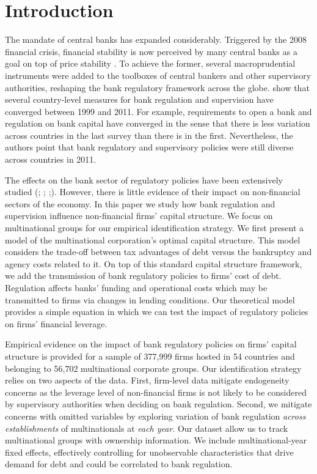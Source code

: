 \documentclass[12pt]{article}
\begin{document}
	\doublespacing
	
	
	\section{Introduction} \label{sec:introduction}
	The mandate of central banks has expanded considerably. Triggered by the 2008 financial crisis, financial stability is now perceived by many central banks as a goal on top of price stability \citep*{blinder2017necessity}. To achieve the former, several macroprudential instruments were added to the toolboxes of central bankers and other supervisory authorities, reshaping the bank regulatory framework across the globe. \cite*{barth2013bank} show that several country-level measures for bank regulation and supervision have converged between 1999 and 2011. For example, requirements to open a bank and regulation on bank capital have converged in the sense that there is less variation across countries in the last survey than there is in the first. Nevertheless, the authors point that bank regulatory and supervisory policies were still diverse across countries in 2011.
	
	The effects on the bank sector of regulatory policies have been extensively studied (\cite*{barth2013}; \cite*{anginer2014does};  \cite*{caprio2014macro};\cite*{demirguc2013bank}). However, there is little evidence of their impact on non-financial sectors of the economy. In this paper we study how bank regulation and supervision influence non-financial firms' capital structure. We focus on multinational groups for our empirical identification strategy. We first present a model of the multinational corporation's optimal capital structure. This model considers the trade-off between tax advantages of debt versus the bankruptcy and agency costs related to it. On top of this standard capital structure framework, we add the transmission of bank regulatory policies to firms' cost of debt. Regulation affects banks' funding and operational costs which may be transmitted to firms via changes in lending conditions. Our theoretical model provides a simple equation in which we can test the impact of regulatory policies on firms' financial leverage.
	
	Empirical evidence on the impact of bank regulatory policies on firms' capital structure is provided for a sample of 377,999 firms hosted in 54 countries and belonging to 56,702 multinational corporate groups. Our identification strategy relies on two aspects of the data. First, firm-level data mitigate endogeneity concerns as the leverage level of non-financial firms is not likely to be considered by supervisory authorities when deciding on bank regulation. Second, we mitigate concerns with omitted variables by exploring variation of bank regulation \textit{across establishments} of multinationals at \textit{each year}. Our dataset allow us to track multinational groups with ownership information. We include multinational-year fixed effects, effectively controlling for unobservable characteristics that drive demand for debt and could be correlated to bank regulation.
	
\end{document}
